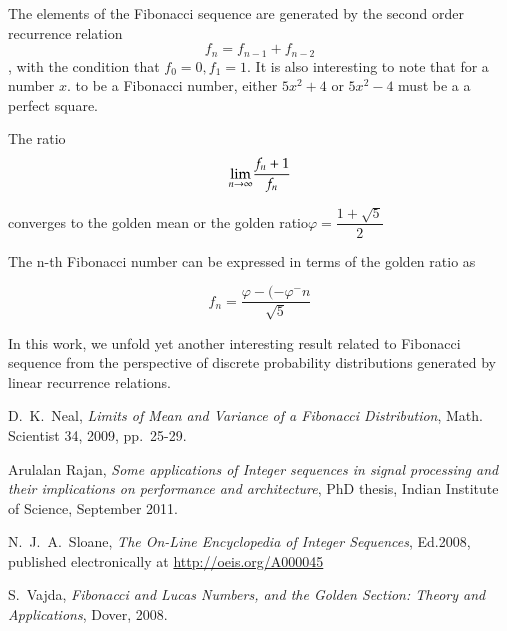 \begin{multicols}{2}
The elements of the Fibonacci sequence are generated by the second order recurrence relation
$$
f_{n}=f_{n-1}+f_{n-2}
$$
, with the condition that $f_{0} = 0, f_{1} = 1$. It is also interesting to note that for a number $x$. to be a Fibonacci number, either $5x^{2} + 4$ or $5x^{2}-4$ must be a a perfect square.

The ratio
$$
{\rm \lim_{{\it n} \rightarrow \infty}} \dfrac{f_{n}+1}{f_{n}}
$$

converges to the golden mean or the golden ratio\break $\varphi =\dfrac{1+\sqrt{5}}{2}$

The n-th Fibonacci number can be expressed in terms of the golden ratio as

\vspace{-.3cm}

$$
f_{n}= \dfrac{\varphi-(-\varphi^{-}n}{\sqrt{5}}
$$

\vspace{-.3cm}

In this work, we unfold yet another interesting result related to Fibonacci sequence from the perspective of discrete probability distributions generated by linear recurrence relations.


\begin{thebibliography}{99} 
 D.~K.~Neal, \textit{Limits of Mean and Variance of a {F}ibonacci Distribution}, Math. Scientist 34, 2009, pp.~25-29.

 Arulalan Rajan, \textit{Some applications of Integer sequences in signal processing and their implications on performance and architecture}, PhD thesis, Indian Institute of Science, September 2011.

 N.~J.~A.~Sloane, \textit{The On-Line Encyclopedia of Integer Sequences}, Ed.2008, published electronically at 
\url{http://oeis.org/A000045}

 S.~Vajda, \textit{{F}ibonacci and {L}ucas Numbers, and the Golden Section: Theory and Applications}, Dover, 2008.

\end{thebibliography}

\end{multicols}

